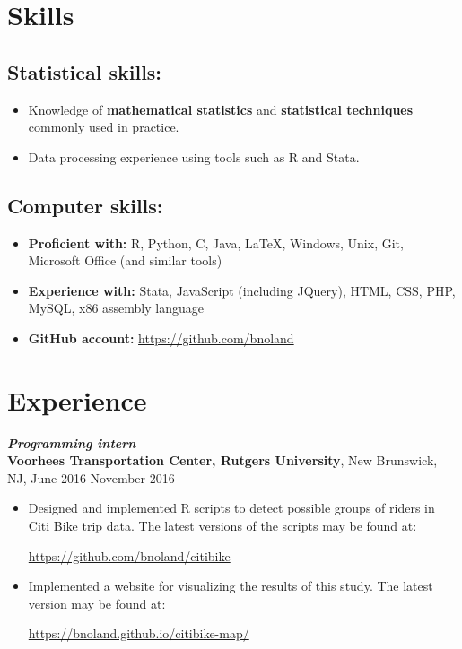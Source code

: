 \documentclass[12pt]{article}
\begin{document}
\section*{Skills}

\subsection*{Statistical skills:}
\begin{itemize}
\item
Knowledge of \textbf{mathematical statistics} and \textbf{statistical techniques} commonly used in practice.
\item
Data processing experience using tools such as R and Stata.
\end{itemize}

\subsection*{Computer skills:}
\begin{itemize}
\item
\textbf{Proficient with:} R, Python, C, Java, \LaTeX, Windows, Unix, Git, Microsoft Office (and similar tools)
\item
\textbf{Experience with:} Stata, JavaScript (including JQuery), HTML, CSS, PHP, MySQL, x86 assembly language
\item
\textbf{GitHub account:} \url{https://github.com/bnoland}
\end{itemize}

\section*{Experience}

\textit{\textbf{Programming intern}} \\
\textbf{Voorhees Transportation Center, Rutgers University}, New Brunswick, NJ, June 2016-November 2016
\begin{itemize}
\item
Designed and implemented R scripts to detect possible groups of riders in Citi Bike trip data. The latest versions of the scripts may be found at:
\begin{center}
\url{https://github.com/bnoland/citibike}
\end{center}

\item
Implemented a website for visualizing the results of this study. The latest version may be found at:
\begin{center}
\url{https://bnoland.github.io/citibike-map/}
\end{center}

\end{itemize}
\end{document}

